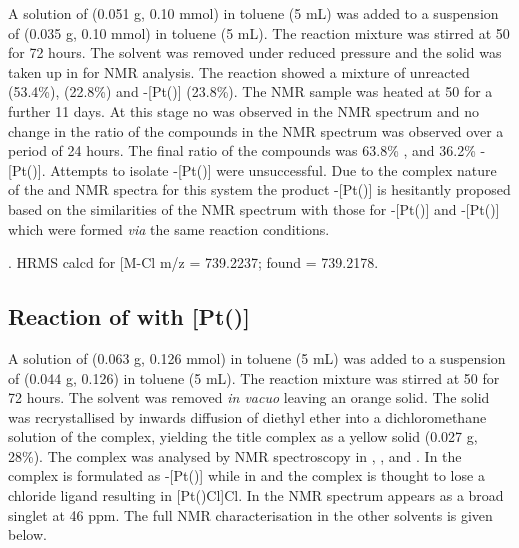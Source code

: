 A solution of \tBusixantphos{} (0.051 g, 0.10 mmol) in toluene (5 mL) was added to a suspension of \ce{[Pt(C6H10)Cl2]} (0.035 g, 0.10 mmol) in toluene (5 mL).  The reaction mixture was stirred at 50 \degC{} for 72 hours.  The solvent was removed under reduced pressure and the solid was taken up in  for NMR analysis.  The reaction showed a mixture of unreacted \tBusixantphos{} (53.4\%), \tBusixantphos {} (22.8\%) and \trans-[Pt(\tBusixantphos)] (23.8\%).  The NMR sample was heated at 50 \degC{} for a further 11 days.  At this stage no \ce{[Pt(C6H10)Cl2]} was observed in the \proton{} NMR spectrum and no change in the ratio of the compounds in the \phosphorus{} NMR spectrum was observed over a period of 24 hours.  The final ratio of the compounds was 63.8\% \tBusixantphos {}, and 36.2\% \trans-[Pt(\tBusixantphos)].  Attempts to isolate \trans-[Pt(\tBusixantphos)] were unsuccessful.  Due to the complex nature of the \proton{} and \carbon{} NMR spectra for this system the product \trans-[Pt(\tBusixantphos)] is hesitantly proposed based on the similarities of the \phosphorus{} NMR spectrum with those for \trans-[Pt(\tButhixantphos)] and \trans-[Pt(\tBuxantphos)] which were formed \emph{via} the same reaction conditions. 

.
HRMS calcd for  [M-Cl\ce{]+} m/z = 739.2237; found = 739.2178.

\subsection*{Reaction of \tBuxantphos{} with [Pt()]}


A solution of \tBuxantphos{} (0.063 g, 0.126 mmol) in toluene (5 mL) was added to a suspension of \ce{[Pt(C6H10)Cl2]} (0.044 g, 0.126) in toluene (5 mL).  The reaction mixture was stirred at 50 \degC{} for 72 hours.  The solvent was removed \emph{in vacuo} leaving an orange solid.  The solid was recrystallised by inwards diffusion of diethyl ether into a dichloromethane solution of the complex, yielding the title complex as a yellow solid (0.027 g, 28\%).  The complex was analysed by NMR spectroscopy in , ,  and .  In  the complex is formulated as \trans-[Pt(\tBuxantphos)] while in  and  the complex is thought to lose a chloride ligand resulting in [Pt(\tBuxantphosk)Cl]Cl.  In  the \phosphorus{} NMR spectrum appears as a broad singlet at 46 ppm.  The full NMR characterisation in the other solvents is given below.  

